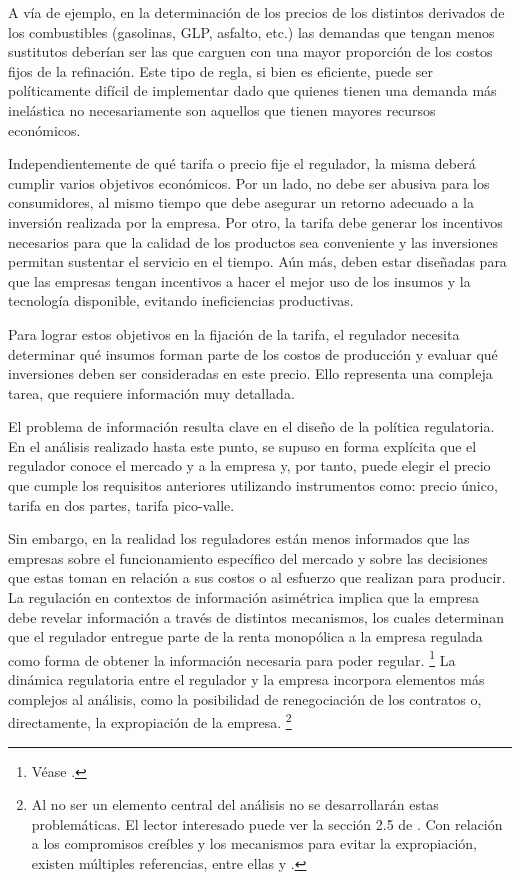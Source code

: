 \documentclass[
  12pt,
  spanish,
]{book}
\begin{document}
A vía de ejemplo, en la determinación de los precios de los distintos derivados de los combustibles (gasolinas, GLP, asfalto, etc.) las demandas que tengan menos sustitutos deberían ser las que carguen con una mayor proporción de los costos fijos de la refinación. Este tipo de regla, si bien es eficiente, puede ser políticamente difícil de implementar dado que quienes tienen una demanda más inelástica no necesariamente son aquellos que tienen mayores recursos económicos.

Independientemente de qué tarifa o precio fije el regulador, la misma deberá cumplir varios objetivos económicos. Por un lado, no debe ser abusiva para los consumidores, al mismo tiempo que debe asegurar un retorno adecuado a la inversión realizada por la empresa. Por otro, la tarifa debe generar los incentivos necesarios para que la calidad de los productos sea conveniente y las inversiones permitan sustentar el servicio en el tiempo. Aún más, deben estar diseñadas para que las empresas tengan incentivos a hacer el mejor uso de los insumos y la tecnología disponible, evitando ineficiencias productivas.

Para lograr estos objetivos en la fijación de la tarifa, el regulador necesita determinar qué insumos forman parte de los costos de producción y evaluar qué inversiones deben ser consideradas en este precio. Ello representa una compleja tarea, que requiere información muy detallada.

El problema de información resulta clave en el diseño de la política regulatoria. En el análisis realizado hasta este punto, se supuso en forma explícita que el regulador conoce el mercado y a la empresa y, por tanto, puede elegir el precio que cumple los requisitos anteriores utilizando instrumentos como: precio único, tarifa en dos partes, tarifa pico-valle.

Sin embargo, en la realidad los reguladores están menos informados que las empresas sobre el funcionamiento específico del mercado y sobre las decisiones que estas toman en relación a sus costos o al esfuerzo que realizan para producir. La regulación en contextos de información asimétrica implica que la empresa debe revelar información a través de distintos mecanismos, los cuales determinan que el regulador entregue parte de la renta monopólica a la empresa regulada como forma de obtener la información necesaria para poder regular.
\footnote{Véase \citet{Baron1982}.}
La dinámica regulatoria entre el regulador y la empresa incorpora elementos más complejos al análisis, como la
posibilidad de renegociación de los contratos o, directamente, la expropiación de la empresa.
\footnote{Al no ser un elemento central del análisis no se desarrollarán estas problemáticas. El lector interesado puede ver la sección 2.5 de \citet{Armstrong2007}. Con relación a los compromisos creíbles y los mecanismos para evitar la expropiación, existen múltiples referencias, entre ellas \citet{Bergara2003} y \citet{Spiller2013}.}
\end{document}
